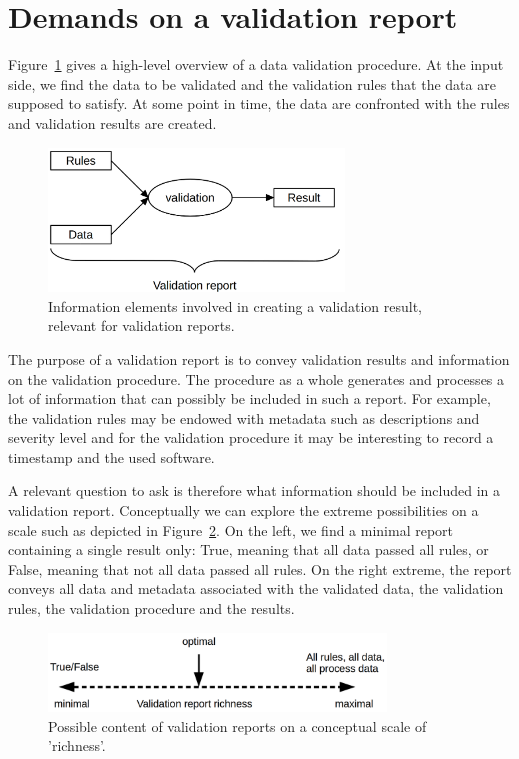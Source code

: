 
\section{Demands on a validation report}
\label{sect:demands}
Figure~\ref{fig:validation} gives a high-level overview of a data validation
procedure. At the input side, we find the data to be validated and the
validation rules that the data are supposed to satisfy. At some point in time,
the data are confronted with the rules and validation results are created. 
%
\begin{figure}[t]
\centering
\includegraphics[width=0.7\textwidth]{fig/validation.png}
\caption{Information elements involved in creating a validation result, relevant for validation reports.}
\label{fig:validation}
\end{figure}

The purpose of a validation report is to convey validation results and
information on the validation procedure. The procedure as a whole generates and
processes a lot of information that can possibly be included in such a report.
For example, the validation rules may be endowed with metadata such as
descriptions and severity level and for the validation procedure it may be
interesting to record a timestamp and the used software.

A relevant question to ask is therefore what information should be included in
a validation report. Conceptually we can explore the extreme possibilities on a
scale such as depicted in Figure~\ref{fig:richness}. On the left, we find a minimal report
containing a single result only: True, meaning that all data passed all rules,
or False, meaning that not all data passed all rules. On the right extreme, the
report conveys all data and metadata associated with the validated data, the
validation rules, the validation procedure and the results.
%
\begin{figure}
\centering
\includegraphics[width=0.8\textwidth]{fig/richness.png}
\caption{Possible content of validation reports on a conceptual scale of 'richness'.}
\label{fig:richness}
\end{figure}


